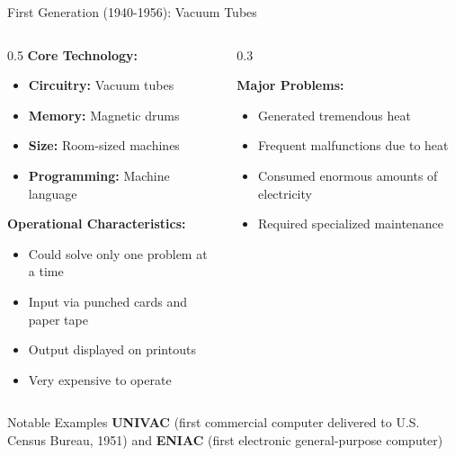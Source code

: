 \documentclass[aspectratio=169]{beamer}
\begin{document}
\begin{frame}{First Generation (1940-1956): Vacuum Tubes}
    \begin{columns}
        \begin{column}{0.5\textwidth}
            \textbf{Core Technology:}
            \begin{itemize}
                \item \textbf{Circuitry:} Vacuum tubes
                \item \textbf{Memory:} Magnetic drums
                \item \textbf{Size:} Room-sized machines
                \item \textbf{Programming:} Machine language
            \end{itemize}
            
            \vspace{0.3cm}
            \textbf{Operational Characteristics:}
            \begin{itemize}
                \item Could solve only one problem at a time
                \item Input via punched cards and paper tape
                \item Output displayed on printouts
                \item Very expensive to operate
            \end{itemize}
        \end{column}
        \begin{column}{0.3\textwidth}
            
            \vspace{0.3cm}
            \textbf{Major Problems:}
            \begin{itemize}
                \item Generated tremendous heat
                \item Frequent malfunctions due to heat
                \item Consumed enormous amounts of electricity
                \item Required specialized maintenance
            \end{itemize}
        \end{column}
    \end{columns}
    
    \begin{exampleblock}{Notable Examples}
        \textbf{UNIVAC} (first commercial computer delivered to U.S. Census Bureau, 1951) and \textbf{ENIAC} (first electronic general-purpose computer)
    \end{exampleblock}
\end{frame}
\end{document}
